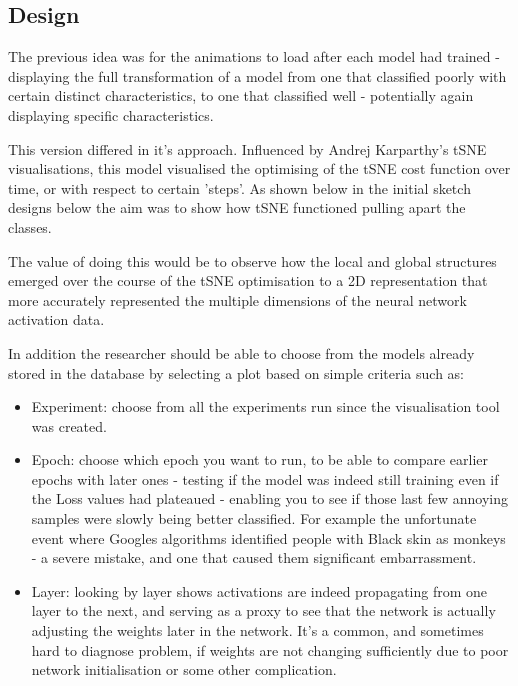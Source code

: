 \documentclass[a4paper,11pt,titlepage]{article}
\begin{document}
	\subsection{Design}
	The previous idea was for the animations to load after each model had trained - displaying the full transformation of a model from one that classified poorly with certain distinct characteristics, to one that classified well - potentially again displaying specific characteristics. 
	\par 
	This version differed in it's approach. Influenced by Andrej Karparthy's tSNE visualisations, this model visualised the optimising of the tSNE cost function over time, or with respect to certain 'steps'. As shown below in the initial sketch designs below the aim was to show how tSNE functioned pulling apart the classes. 
	\par 
	The value of doing this would be to observe how the local and global structures emerged over the course of the tSNE optimisation to a 2D representation that more accurately represented the multiple dimensions of the neural network activation data. 
	\par 
	In addition the researcher should be able to choose from the models already stored in the database by selecting a plot based on simple criteria such as: 
	\begin{itemize}
		\item Experiment: choose from all the experiments run since the visualisation tool was created.
		\item Epoch: choose which epoch you want to run, to be able to compare earlier epochs with later ones - testing if the model was indeed still training even if the Loss values had plateaued - enabling you to see if those last few annoying samples were slowly being better classified. For example the unfortunate event where Googles algorithms identified people with Black skin as monkeys - a severe mistake, and one that caused them significant embarrassment. 
		\item Layer: looking by layer shows activations are indeed propagating from one layer to the next, and serving as a proxy to see that the network is actually adjusting the weights later in the network. It's a common, and sometimes hard to diagnose problem, if weights are not changing sufficiently due to poor network initialisation or some other complication.
	\end{itemize}	 
	
\end{document}
